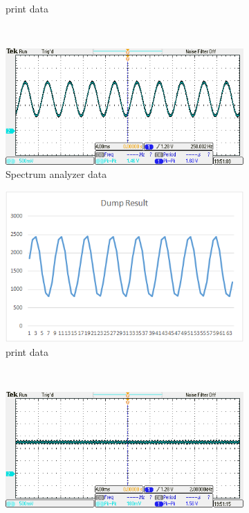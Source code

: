 \documentclass[a4paper]{article}
\newlength{\pic}
\begin{document}
\begin{figure}[htp]
\begin{subfigure}[H]{\picc}
	\caption{print data}
	\end{subfigure}
	\\
	\begin{subfigure}[H]{\picb}
	\includegraphics[width=\picb]{oscilloscope/fir250}
	\caption{Spectrum analyzer data}
	\end{subfigure}
	\begin{subfigure}[H]{\picc}
	\includegraphics[width=\picc]{Plots/P3_250}
	\caption{print data}
	\end{subfigure}
	\\
	\begin{subfigure}[H]{\picb}
	\includegraphics[width=\picb]{oscilloscope/fir2000}

\end{subfigure}
\end{figure}
\end{document}
